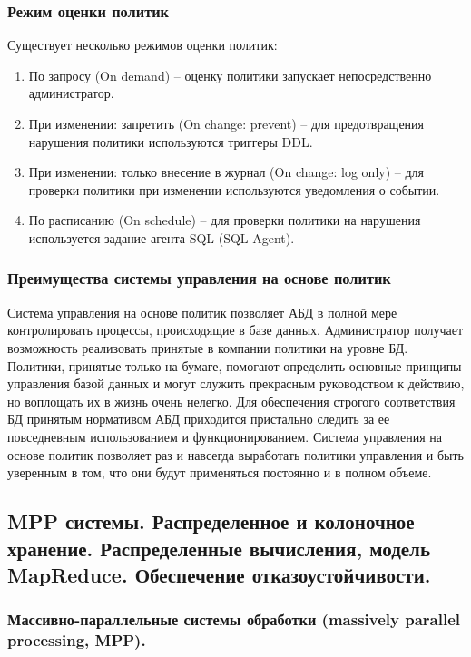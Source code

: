 \subsubsection{Режим оценки политик}

Существует несколько режимов оценки политик:

\begin{enumerate}
	\item По запросу (On demand) – оценку политики запускает непосредственно
	администратор.
	\item При изменении: запретить (On change: prevent) – для предотвращения
	нарушения политики используются триггеры DDL.
	\item При изменении: только внесение в журнал (On change: log only) – для проверки политики при изменении используются уведомления о событии.
	\item По расписанию (On schedule) – для проверки политики на нарушения
	используется задание агента SQL (SQL Agent).
\end{enumerate}

\subsubsection{Преимущества системы управления на основе политик}

Система управления на основе политик позволяет АБД в полной мере контролировать процессы, происходящие в базе данных. Администратор
получает возможность реализовать принятые в компании политики на уровне БД. Политики, принятые только на бумаге, помогают определить основные принципы управления базой данных и могут служить прекрасным руководством к действию, но воплощать их в жизнь очень нелегко. Для обеспечения строгого соответствия БД принятым нормативом АБД приходится пристально следить за ее повседневным использованием и функционированием. Система управления на основе политик позволяет раз и навсегда выработать политики управления и быть уверенным в том, что они будут применяться постоянно и в полном объеме.

\newpage

\subsection{MPP системы. Распределенное и колоночное хранение. Распределенные вычисления, модель MapReduce. Обеспечение отказоустойчивости.}

\subsubsection{Массивно-параллельные системы обработки (massively parallel processing, MPP).}

